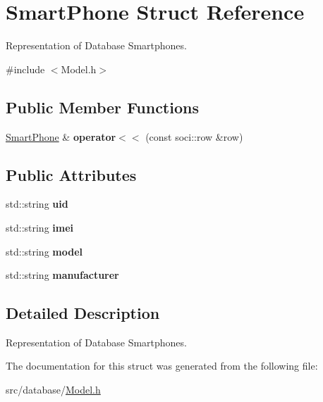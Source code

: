 \hypertarget{struct_smart_phone}{\section{Smart\-Phone Struct Reference}
\label{struct_smart_phone}
}


Representation of Database Smartphones.  




{\ttfamily \#include $<$Model.\-h$>$}

\subsection*{Public Member Functions}
\begin{DoxyCompactItemize}
\item 
\hypertarget{struct_smart_phone_aa0a777c7e0d6a2b19d73dedb78f570cf}{\hyperlink{struct_smart_phone}{Smart\-Phone} \& {\bfseries operator$<$$<$} (const soci\-::row \&row)}\label{struct_smart_phone_aa0a777c7e0d6a2b19d73dedb78f570cf}

\end{DoxyCompactItemize}
\subsection*{Public Attributes}
\begin{DoxyCompactItemize}
\item 
\hypertarget{struct_smart_phone_adb7f2fd8e86f9c095551041b845da225}{std\-::string {\bfseries uid}}\label{struct_smart_phone_adb7f2fd8e86f9c095551041b845da225}

\item 
\hypertarget{struct_smart_phone_a7096de8035bfcfccc1a725136a42c1f6}{std\-::string {\bfseries imei}}\label{struct_smart_phone_a7096de8035bfcfccc1a725136a42c1f6}

\item 
\hypertarget{struct_smart_phone_a65f56e63e80930d36ba3eebd8196e442}{std\-::string {\bfseries model}}\label{struct_smart_phone_a65f56e63e80930d36ba3eebd8196e442}

\item 
\hypertarget{struct_smart_phone_a0a5b20d6644c8402b229cd7c37b2f7a8}{std\-::string {\bfseries manufacturer}}\label{struct_smart_phone_a0a5b20d6644c8402b229cd7c37b2f7a8}

\end{DoxyCompactItemize}


\subsection{Detailed Description}
Representation of Database Smartphones. 

The documentation for this struct was generated from the following file\-:\begin{DoxyCompactItemize}
\item 
src/database/\hyperlink{_model_8h}{Model.\-h}\end{DoxyCompactItemize}
